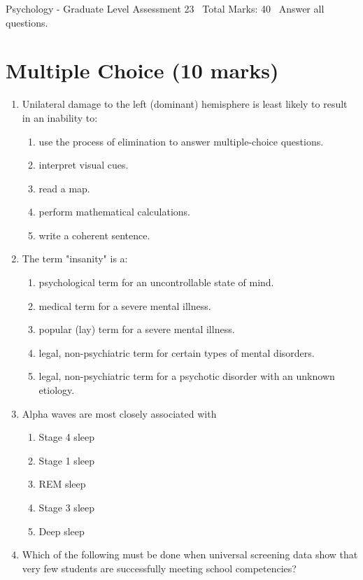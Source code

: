 \documentclass[12pt]{article}
\begin{document}
\begin{center}
Psychology - Graduate Level Assessment 23 \
Total Marks: 40 \
Answer all questions.
\end{center}

\section*{Multiple Choice (10 marks)}
\begin{enumerate}[label=\arabic*.]
\item Unilateral damage to the left (dominant) hemisphere is least likely to result in an inability to:
\begin{enumerate}[label=(\alph*)]
    \item use the process of elimination to answer multiple-choice questions.
    \item interpret visual cues.
    \item read a map.
    \item perform mathematical calculations.
    \item write a coherent sentence.
\end{enumerate}
\item The term "insanity" is a:
\begin{enumerate}[label=(\alph*)]
    \item psychological term for an uncontrollable state of mind.
    \item medical term for a severe mental illness.
    \item popular (lay) term for a severe mental illness.
    \item legal, non-psychiatric term for certain types of mental disorders.
    \item legal, non-psychiatric term for a psychotic disorder with an unknown etiology.
\end{enumerate}
\item Alpha waves are most closely associated with
\begin{enumerate}[label=(\alph*)]
    \item Stage 4 sleep
    \item Stage 1 sleep
    \item REM sleep
    \item Stage 3 sleep
    \item Deep sleep
\end{enumerate}
\item Which of the following must be done when universal screening data show that very few students are successfully meeting school competencies?

\end{enumerate}
\end{document}
